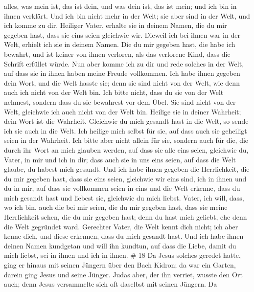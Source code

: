 alles, was mein ist, das ist dein, und was dein ist, das ist mein; und
ich bin in ihnen verklärt.  Und ich bin nicht mehr in der
Welt; sie aber sind in der Welt, und ich komme zu dir. Heiliger Vater,
erhalte sie in deinem Namen, die du mir gegeben hast, dass sie eins
seien gleichwie wir.  Dieweil ich bei ihnen war in der
Welt, erhielt ich sie in deinem Namen. Die du mir gegeben hast, die habe
ich bewahrt, und ist keiner von ihnen verloren, als das verlorene Kind,
dass die Schrift erfüllet würde.  Nun aber komme ich zu dir
und rede solches in der Welt, auf dass sie in ihnen haben meine Freude
vollkommen.  Ich habe ihnen gegeben dein Wort, und die Welt
hasste sie; denn sie sind nicht von der Welt, wie denn auch ich nicht
von der Welt bin.  Ich bitte nicht, dass du sie von der
Welt nehmest, sondern dass du sie bewahrest vor dem Übel. 
Sie sind nicht von der Welt, gleichwie ich auch nicht von der Welt bin.
 Heilige sie in deiner Wahrheit; dein Wort ist die
Wahrheit.  Gleichwie du mich gesandt hast in die Welt, so
sende ich sie auch in die Welt.  Ich heilige mich selbst
für sie, auf dass auch sie geheiligt seien in der Wahrheit.
 Ich bitte aber nicht allein für sie, sondern auch für die,
die durch ihr Wort an mich glauben werden,  auf dass sie
alle eins seien, gleichwie du, Vater, in mir und ich in dir; dass auch
sie in uns eins seien, auf dass die Welt glaube, du habest mich gesandt.
 Und ich habe ihnen gegeben die Herrlichkeit, die du mir
gegeben hast, dass sie eins seien, gleichwie wir eins sind,
 ich in ihnen und du in mir, auf dass sie vollkommen seien
in eins und die Welt erkenne, dass du mich gesandt hast und liebest sie,
gleichwie du mich liebst.  Vater, ich will, dass, wo ich
bin, auch die bei mir seien, die du mir gegeben hast, dass sie meine
Herrlichkeit sehen, die du mir gegeben hast; denn du hast mich geliebt,
ehe denn die Welt gegründet ward.  Gerechter Vater, die
Welt kennt dich nicht; ich aber kenne dich, und diese erkennen, dass du
mich gesandt hast.  Und ich habe ihnen deinen Namen
kundgetan und will ihn kundtun, auf dass die Liebe, damit du mich
liebst, sei in ihnen und ich in ihnen. \# 18  Da Jesus
solches geredet hatte, ging er hinaus mit seinen Jüngern über den Bach
Kidron; da war ein Garten, darein ging Jesus und seine Jünger.
 Judas aber, der ihn verriet, wusste den Ort auch; denn
Jesus versammelte sich oft daselbst mit seinen Jüngern.  Da
